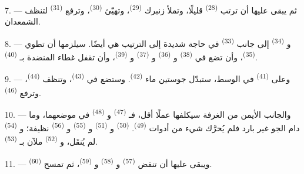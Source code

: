 7. --- ثم يبقى عليها أن ترتب  \textsuperscript{(28)}
قليلًا، وتملأ زنبرك  \textsuperscript{(29)}، وتهيّئ
 \textsuperscript{(30)}، وترفع 
\textsuperscript{(31)} لتنظف الشمعدان.

\VUsaut{5.0mm}
\VUsaut{3.0mm}

8. --- و \textsuperscript{(34)} إلى جانب 
\textsuperscript{(33)} في حاجة شديدة إلى الترتيب هي أيضًا. سيلزمها أن تطوي
 \textsuperscript{(35)}، وأن تضع في 
\textsuperscript{(38)}  و \textsuperscript{(36)}
و \textsuperscript{(37)} و \textsuperscript{(39)}، وأن
تقفل غطاء المنضدة بـ \textsuperscript{(40)}.

9. --- وعلى  \textsuperscript{(41)} في الوسط، ستبدّل
جوستين ماء  \textsuperscript{(42)}. وستضع  في
 \textsuperscript{(43)}، وتنظف 
\textsuperscript{(44)}، وترفع  \textsuperscript{(46)}.

10. --- والجانب الأيمن من الغرفة سيكلفها عملًا أقل، فـ
\textsuperscript{(47)} و \textsuperscript{(48)} في موضعهما، وما دام
الجو غير بارد فلم يُحرَّك شيء من أدوات  \textsuperscript{(49)}.
 \textsuperscript{(50)} و \textsuperscript{(51)}
و \textsuperscript{(55)} و
\textsuperscript{(56)} نظيفة؛ و \textsuperscript{(54)} لم يُنقَل،
و \textsuperscript{(52)} ملآن بـ
\textsuperscript{(53)}.



11. --- ويبقى عليها أن تنفض  \textsuperscript{(57)}
و \textsuperscript{(58)} و
\textsuperscript{(59)}، ثم تمسح  \textsuperscript{(60)}.

